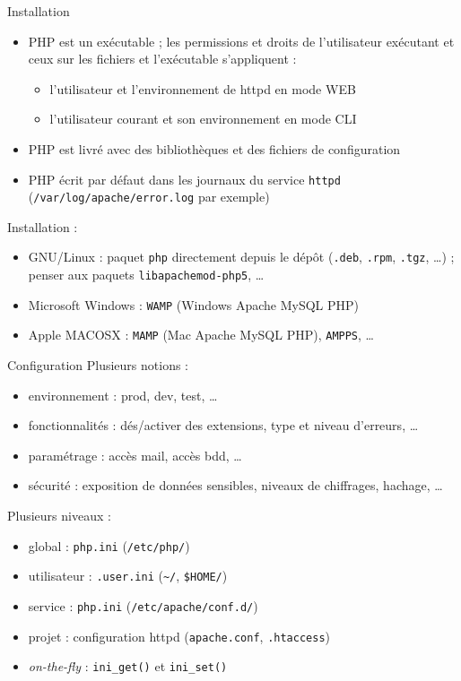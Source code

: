 \begin{frame}{Installation}
	\begin{itemize}
		\item PHP est un exécutable ; les permissions et droits de l'utilisateur exécutant et ceux sur les fichiers et l'exécutable s'appliquent :
			\begin{itemize}
				\item l'utilisateur et l'environnement de httpd en mode WEB
				\item l'utilisateur courant et son environnement en mode CLI
			\end{itemize}
		\item PHP est livré avec des bibliothèques et des fichiers de configuration
		\item PHP écrit par défaut dans les journaux du service \texttt{httpd} (\texttt{/var/log/apache/error.log} par exemple)
	\end{itemize}
	Installation :
	\begin{itemize}
		\item GNU/Linux : paquet \texttt{php} directement depuis le dépôt (\texttt{.deb}, \texttt{.rpm}, \texttt{.tgz}, \ldots) ; penser aux paquets \texttt{libapachemod-php5}, \ldots
		\item Microsoft Windows : \texttt{WAMP} (Windows Apache MySQL PHP)
		\item Apple MACOSX : \texttt{MAMP} (Mac Apache MySQL PHP), \texttt{AMPPS}, \ldots
	\end{itemize}
\end{frame}

\begin{frame}{Configuration}
	Plusieurs notions :
	\begin{itemize}
		\item environnement : prod, dev, test, \ldots
		\item fonctionnalités : dés/activer des extensions, type et niveau d'erreurs, \ldots
		\item paramétrage : accès mail, accès bdd, \ldots
		\item sécurité : exposition de données sensibles, niveaux de chiffrages, hachage, \ldots
	\end{itemize}
	Plusieurs niveaux :
	\begin{itemize}
		\item global : \texttt{php.ini} (\texttt{/etc/php/})
		\item utilisateur : \texttt{.user.ini} (\texttt{\textasciitilde/}, \texttt{\$HOME/})
		\item service : \texttt{php.ini} (\texttt{/etc/apache/conf.d/})
		\item projet : configuration httpd (\texttt{apache.conf}, \texttt{.htaccess})
		\item \emph{on-the-fly} : \texttt{ini\_get()} et \texttt{ini\_set()}
	\end{itemize}
\end{frame}

